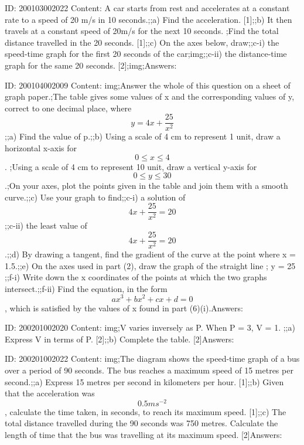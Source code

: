 \documentclass{article}
\begin{document}
ID: 200103002022
Content:
A car starts from rest and accelerates at a constant rate to a speed of 20 m/s in 10 seconds.;;a) Find the acceleration.    [1];;b) It then travels at a constant speed of 20m/s for the next 10 seconds. ;Find the total distance travelled in the 20 seconds.    [1];;c) On the axes below, draw;;c-i) the speed-time graph for the first 20 seconds of the car;img;;c-ii) the distance-time graph for the same 20 seconds.    [2];img;Answers:

ID: 200104002009
Content:
img;Answer the whole of this question on a sheet of graph paper.;The table gives some values of x and the corresponding values of y, correct to one decimal place, where $$y = 4x + \frac{25}{x^2}$$;;a) Find the value of p.;;b) Using a scale of 4 cm to represent 1 unit, draw a horizontal x-axis for $$0 \leq x \leq 4$$. ;Using a scale of 4 cm to represent 10 unit, draw a vertical y-axis for $$0 \leq y \leq 30$$.;On your axes, plot the points given in the table and join them with a smooth curve.;;c) Use your graph to find;;c-i) a solution of $$4x + \frac{25}{x^2} = 20$$;;c-ii) the least value of $$4x + \frac{25}{x^2} = 20$$.;;d) By drawing a tangent, find the gradient of the curve at the point where x = 1.5.;;e) On the axes used in part (2), draw the graph of the straight line ; y = 25 ;;f-i) Write down the x coordinates of the points at which the two graphs intersect.;;f-ii) Find the equation, in the form $$ax^3 + bx^2 + cx + d = 0$$, which is satisfied by the values of x found in part (6)(i).Answers:

ID: 200201002020
Content:
img;V varies inversely as P. When P = 3, V = 1. ;;a) Express V in terms of P. [2];;b) Complete the table. [2]Answers:

ID: 200201002022
Content:
img;The diagram shows the speed-time graph of a bus over a period of 90 seconds. The bus reaches a maximum speed of 15 metres per second.;;a) Express 15 metres per second in kilometers per hour. [1];;b) Given that the acceleration was $$0.5 ms^{-2} $$, calculate the time taken, in seconds, to reach its maximum speed. [1];;c) The total distance travelled during the 90 seconds was 750 metres. Calculate the length of time that the bus was travelling at its maximum speed. [2]Answers:
\end{document}

